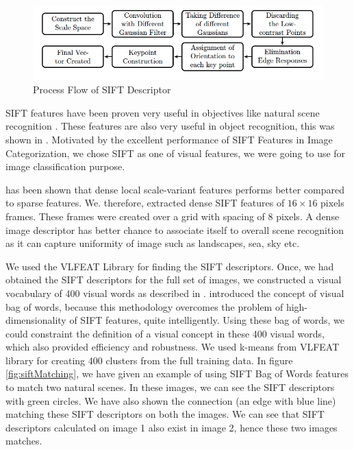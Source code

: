  \begin{center}
\begin{figure}
\centering
\includegraphics[width=\linewidth]{./Pictures/SIFT/siftSteps.jpg}
\caption{Process Flow of SIFT Descriptor }
\label{fig:siftProcess}
\end{figure}
\end{center}
SIFT features have been proven very useful in objectives like natural scene recognition \citet*{naturalSceneRecognition}. These features are also very useful in object recognition, this was shown in \citet*{lowe}. Motivated by the excellent performance of SIFT Features in Image Categorization, we chose SIFT as one of visual features, we were going to use for image classification purpose.

  has been shown that dense local scale-variant features performs better compared to sparse features. We. therefore, extracted dense SIFT features of $16 \times 16$ pixels frames. These frames were created over a grid with spacing of 8 pixels. A dense image descriptor has better chance to associate itself to overall scene recognition as it can capture uniformity of image such as landscapes, sea, sky etc. 

We used the VLFEAT Library for finding the SIFT descriptors. Once, we had obtained the SIFT descriptors for the full set of images, we 
constructed a visual vocabulary of 400 visual words as described in \citet*{bagOfWords}.  introduced the 
concept of visual bag of words, because this methodology overcomes the problem of high-dimensionality of SIFT features, quite intelligently. Using these bag of words, we could constraint the definition of a visual concept in these 400 visual words, which also provided efficiency and robustness. We used k-means from VLFEAT library \citet*{vlfeat} for creating 400 clusters from the full training 
data. In figure \ref{fig:siftMatching}, we have given an example of using SIFT Bag of Words features to match two natural scenes. In these images, we can see the SIFT descriptors with green circles. We have also shown the connection (an edge with blue line) matching these SIFT descriptors on both the images. We can see that SIFT descriptors calculated on image 1 also exist in image 2, hence these two images matches.

